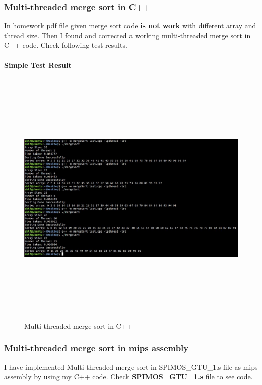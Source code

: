 \documentclass{article}
\begin{document}
\subsubsection{Multi-threaded merge sort in C++}
In homework pdf file given merge sort code \textbf{is not work} with different array and thread size. Then I found and corrected a working
multi-threaded merge sort in C++ code. Check following test results. \\ \\
\textbf{Simple Test Result} \\
\begin{figure}[H]
    \centering
	\includegraphics[width=7in, height=5in]{35.JPG}
	\caption[Optional caption]{Multi-threaded merge sort in C++}
	\label{}
\end{figure}
\subsubsection{Multi-threaded merge sort in mips assembly}
I have implemented Multi-threaded merge sort in SPIMOS\_GTU\_1.s file as mips assembly by using my C++ code.
Check \textbf{SPIMOS\_GTU\_1.s} file to see code.
\end{document}
